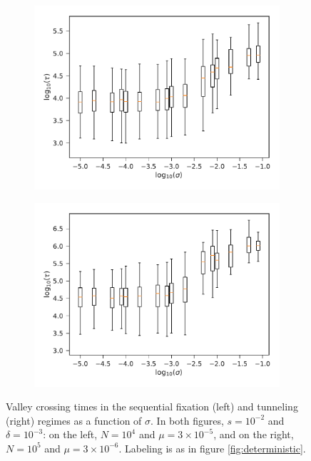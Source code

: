\documentclass[10pt,twocolumn,twoside]{gsajnl}
\begin{document}
\begin{spacing}{1.5}
\begin{figure}[t]
\begin{subfigure}[b]{0.4\textwidth}
\includegraphics[width=\textwidth]{Figures/seq_fix.pdf}
\end{subfigure}
\begin{subfigure}[b]{0.4\textwidth}
\includegraphics[width=\textwidth]{Figures/neut_tunnel.pdf}
\end{subfigure}
\caption{Valley crossing times in the sequential fixation (left) and tunneling (right) regimes as a function of $\sigma$. In both figures, $s = 10^{-2}$ and $\delta = 10^{-3}$: on the left, $N = 10^4$ and $\mu = 3\times 10^{-5}$, and on the right, $N = 10^5$ and $\mu = 3\times 10^{-6}$. Labeling is as in figure \ref{fig:deterministic}.}
\label{fig:tunneling}
\end{figure}
\fi


\end{spacing}
\end{document}
